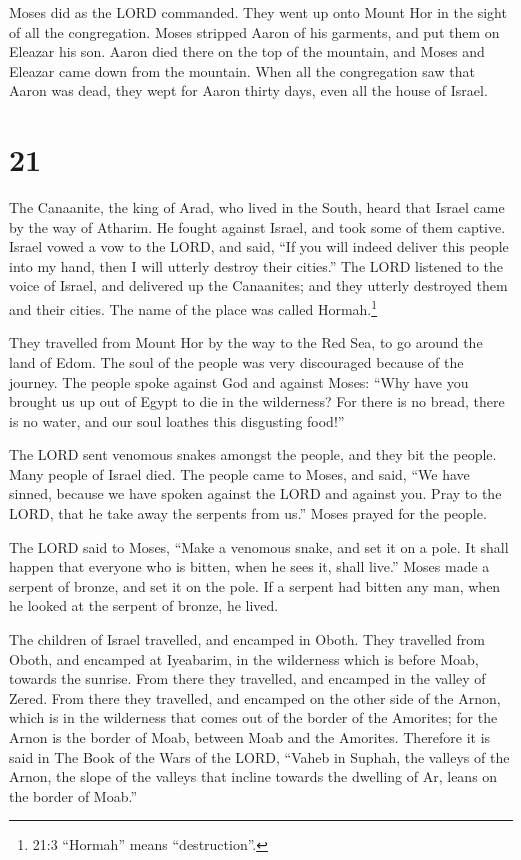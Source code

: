  Moses did as the LORD commanded. They went up onto Mount
Hor in the sight of all the congregation.  Moses stripped
Aaron of his garments, and put them on Eleazar his son. Aaron died there
on the top of the mountain, and Moses and Eleazar came down from the
mountain.  When all the congregation saw that Aaron was
dead, they wept for Aaron thirty days, even all the house of Israel.

\hypertarget{section-20}{%
\section{21}\label{section-20}}

 The Canaanite, the king of Arad, who lived in the South,
heard that Israel came by the way of Atharim. He fought against Israel,
and took some of them captive.  Israel vowed a vow to the
LORD, and said, ``If you will indeed deliver this people into my hand,
then I will utterly destroy their cities.''  The LORD
listened to the voice of Israel, and delivered up the Canaanites; and
they utterly destroyed them and their cities. The name of the place was
called Hormah.\footnote{21:3 ``Hormah'' means ``destruction''.}

 They travelled from Mount Hor by the way to the Red Sea, to
go around the land of Edom. The soul of the people was very discouraged
because of the journey.  The people spoke against God and
against Moses: ``Why have you brought us up out of Egypt to die in the
wilderness? For there is no bread, there is no water, and our soul
loathes this disgusting food!''

 The LORD sent venomous snakes amongst the people, and they
bit the people. Many people of Israel died.  The people came
to Moses, and said, ``We have sinned, because we have spoken against the
LORD and against you. Pray to the LORD, that he take away the serpents
from us.'' Moses prayed for the people.

 The LORD said to Moses, ``Make a venomous snake, and set it
on a pole. It shall happen that everyone who is bitten, when he sees it,
shall live.''  Moses made a serpent of bronze, and set it on
the pole. If a serpent had bitten any man, when he looked at the serpent
of bronze, he lived.

 The children of Israel travelled, and encamped in Oboth.
 They travelled from Oboth, and encamped at Iyeabarim, in
the wilderness which is before Moab, towards the sunrise. 
From there they travelled, and encamped in the valley of Zered.
 From there they travelled, and encamped on the other side
of the Arnon, which is in the wilderness that comes out of the border of
the Amorites; for the Arnon is the border of Moab, between Moab and the
Amorites.  Therefore it is said in The Book of the Wars of
the LORD, ``Vaheb in Suphah, the valleys of the Arnon,  the
slope of the valleys that incline towards the dwelling of Ar, leans on
the border of Moab.''

